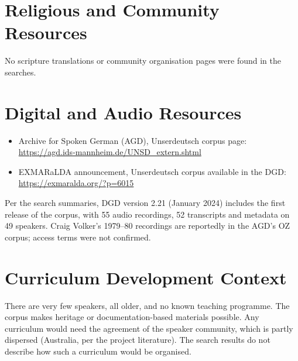 \documentclass[12pt]{article}
\begin{document}
\section{Religious and Community Resources}
No scripture translations or community organisation pages were found in the searches.

\section{Digital and Audio Resources}
\begin{itemize}
\item Archive for Spoken German (AGD), Unserdeutsch corpus page: \url{https://agd.ids-mannheim.de/UNSD_extern.shtml}
\item EXMARaLDA announcement, Unserdeutsch corpus available in the DGD: \url{https://exmaralda.org/?p=6015}
\end{itemize}
Per the search summaries, DGD version 2.21 (January 2024) includes the first release of the corpus, with 55 audio recordings, 52 transcripts and metadata on 49 speakers. Craig Volker's 1979--80 recordings are reportedly in the AGD's OZ corpus; access terms were not confirmed.

\section{Curriculum Development Context}
There are very few speakers, all older, and no known teaching programme. The corpus makes heritage or documentation-based materials possible. Any curriculum would need the agreement of the speaker community, which is partly dispersed (Australia, per the project literature). The search results do not describe how such a curriculum would be organised.
\end{document}
